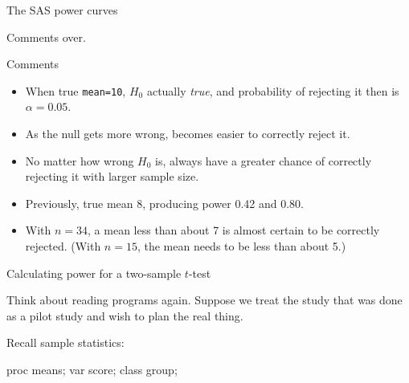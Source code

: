 \documentclass[unknownkeysallowed]{beamer}\usepackage[]{graphicx}\usepackage[]{color}
\begin{document}
\begin{frame}[fragile]{The SAS power curves}
  
  
Comments over.


\end{frame}


\begin{frame}[fragile]{Comments}
  \begin{itemize}
  \item When true \texttt{mean=10}, $H_0$ actually \emph{true}, and
    probability of rejecting it then is $\alpha=0.05$.
  \item As the null gets more wrong, becomes easier to
    correctly reject it.
  \item No matter how wrong $H_0$ is, always have a greater chance of
    correctly rejecting it with larger sample size.
  \item Previously, true mean 8, producing power 0.42 and 0.80.
  \item With $n=34$, a mean less than about 7 is
    almost certain to be correctly rejected. (With $n=15$, the
    mean needs to be less than about 5.)
  \end{itemize}
\end{frame}


\begin{frame}[fragile]{Calculating power for a two-sample $t$-test}

  
Think about reading programs again. Suppose we treat the study that
was done as a pilot study and wish to plan the real thing.

Recall sample statistics:

\begin{Sascode}[store=ph]
proc means;
  var score;
  class group;
\end{Sascode}




\end{frame}
\end{document}
